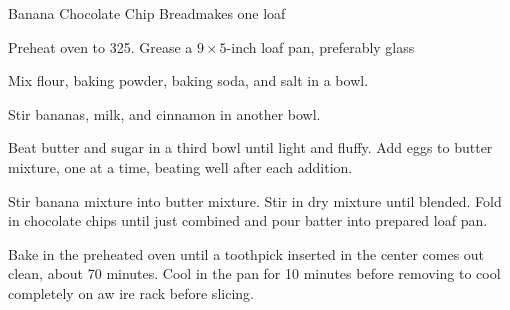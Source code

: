 \begin{recipe}{Banana Chocolate Chip Bread}{}{makes one loaf}

Preheat oven to 325\degrees. Grease a $9 \times 5$-inch loaf pan, preferably glass

Mix flour, baking powder, baking soda, and salt in a bowl.

Stir bananas, milk, and cinnamon in another bowl.

Beat butter and sugar in a third bowl until light and fluffy. 
Add eggs to butter mixture, one at a time, beating well after each addition.

Stir banana mixture into butter mixture.
Stir in dry mixture until blended. 
Fold in chocolate chips until just combined and pour batter into prepared loaf pan.

\newstep
Bake in the preheated oven until a toothpick inserted in the center comes out clean, about 70 minutes.
Cool in the pan for 10 minutes before removing to cool completely on aw ire rack before slicing.

\end{recipe}